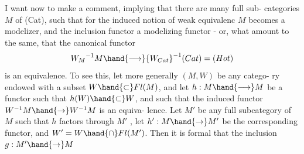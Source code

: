 I want now to make a comment, implying that there are many full sub-%
categories $M$ of (Cat), such that for the induced notion of weak equivalenc
$M$ becomes a modelizer, and the inclusion functor a modelizing functor -
or, what amount to the same, that the canonical functor
\[ {W_M}^{-1}M \hand{\longrightarrow} {W_{Cat}}^{-1}(Cat) = (Hot) \]
is an equivalence. To see this, let more generally $(M,W)$ be any catego-%
ry endowed with a subset $W \hand{\subset} Fl(M)$, and let $h: M \hand{\longrightarrow} M$ be a functor such
that $h(W) \hand{\subset} W$, and such that the induced functor $W^{-1}M \hand{\to} W^{-1}M$ is an equiva-%
lence. Let   $M'$ be any full subcategory of $M$ such that
$h$ factors through $M'$ , let $h': M \hand{\to} M'$ be the corresponding  functor, and
$W' = W \hand{\cap} Fl(M')$. Then it is formal that  the inclusion $g: M' \hand{\to} M$
